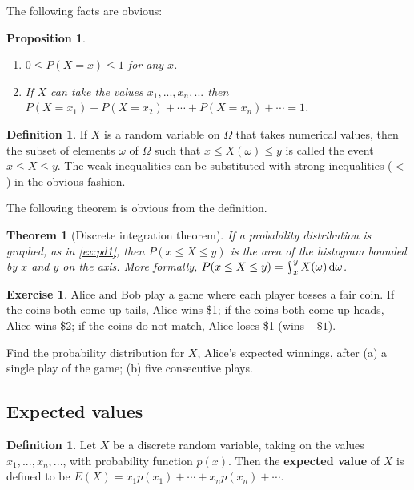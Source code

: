 \documentclass[a4paper,leqno]{article}
\DeclareMathOperator*{\rint}{\scalerel*{\rotatebox{17}{$\!\int\!$}}{\int}}
\numberwithin{equation}{section}
\newtheorem{thm}[equation]{Theorem}
\newtheorem{prp}[equation]{Proposition}
\theoremstyle{definition}
\newtheorem{defn}[equation]{Definition}
\newtheorem{exercise}[equation]{Exercise}
\theoremstyle{remark}
\newcommand{\df}{\textbf}
\begin{document}
The following facts are obvious:
\begin{prp}\label{prp:distfacts}\leavevmode
  \begin{enumerate}
    \item $ 0 \leq P(X = x) \leq 1 $ for any $ x $.
    \item If $ X $ can take the values $ x_1, ..., x_n, ... $ then $ P(X = x_1) + P(X = x_2) + \cdots + P(X = x_n) + \cdots = 1 $.
  \end{enumerate}
\end{prp}

\begin{defn}
  If $ X $ is a random variable on $ \Omega $ that takes numerical values, then the subset of elements $ \omega $ of $ \Omega $ such that $ x \leq X(\omega) \leq y $
  is called the event $ x \leq X \leq y $. The weak inequalities can be substituted with strong inequalities (${}<{}$) in the obvious fashion.
\end{defn}

The following theorem is obvious from the definition.
\begin{thm}[Discrete integration theorem]
  If a probability distribution is graphed, as in \ref{ex:pd1}, then $ P(x \leq X \leq y) $ is the area of the histogram
  bounded by $ x $ and $ y $ on the axis. More formally, $ P(x \leq X \leq y) = \rint_x^y X(\omega) \dif{\omega} $.
\end{thm}

\begin{exercise}\label{exercise:cointoss1}
  Alice and Bob play a game where each player tosses a fair coin. If the coins both come up
  tails, Alice wins \$1; if the coins both come up heads, Alice wins \$2; if the coins do not
  match, Alice loses \$1 (wins $-\$1$).

  Find the probability distribution for $ X $, Alice's expected winnings, after (a) a single
  play of the game; (b) five consecutive plays.
\end{exercise}

\subsection{Expected values}
\begin{defn}
  Let $ X $ be a discrete random variable, taking on the values $ x_1,...,x_n,...$, with probability function $ p(x) $. Then
  the \df{expected value} of $ X $ is defined to be $ E(X) = x_1 p(x_1) + \cdots + x_n p(x_n) + \cdots $.
\end{defn}
\end{document}
